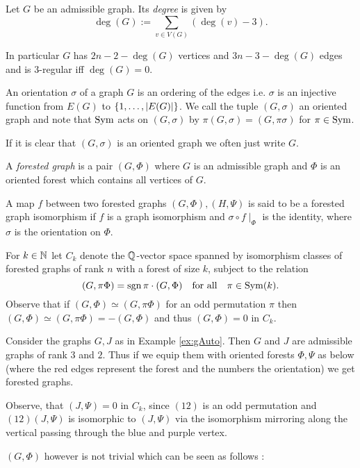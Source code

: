 \begin{definition}
	Let $G$ be an admissible graph. Its \emph{degree} is given by
	\[
		\deg(G) := \sum_{v \in V(G)} (\deg(v) - 3)
	.\] 
\end{definition}

In particular $G$ has $2n -2 - \deg(G)$ vertices and $3n -3 - \deg(G)$ edges and is $3$-regular iff $\deg(G) = 0$.

\begin{definition}
	An orientation $\sigma$ of a graph $G$ is an ordering of the edges i.e. $\sigma$ is an injective function from $E(G)$ to $\{1,\ldots,\abs{E(G)}\}$.
	We call the tuple $(G,\sigma)$ an oriented graph and note that $\operatorname{Sym}$ acts on $(G,\sigma)$ by $\pi (G,\sigma) = (G,\pi \sigma)$ for $\pi \in \operatorname{Sym}$.
\end{definition}

If it is clear that $(G,\sigma)$ is an oriented graph we often just write $G$.

\begin{definition}
	A \emph{forested graph} is a pair $(G,\Phi)$ where $G$ is an admissible graph and $\Phi$ is an oriented forest which contains all vertices of $G$.

	A map $f$ between two forested graphs $(G,\Phi), (H,\Psi)$ is said to be a forested graph isomorphism if $f$ is a graph isomorphism and $\sigma \circ f \mid_{\Phi} $  is
	the identity, where $\sigma$ is the orientation on $\Phi$.
\end{definition}

For $k \in \mathbb{N}$ let $C_{k}$ denote the $\mathbb{Q}$-vector space spanned by isomorphism classes of forested graphs of rank $n$ with a forest of size $k$, subject to the relation
\[
	(G,\pi \Phi) = \sgn{\pi} \cdot (G,\Phi) \qq{for all} \pi \in \on{Sym}(k)
.\]
Observe that if $(G,\Phi) \simeq (G,\pi \Phi)$ for an odd permutation $\pi$ then $(G,\Phi) \simeq (G,\pi \Phi) = - (G,\Phi)$ and thus $(G,\Phi) = 0$ in  $C_{k}$.

\begin{eg}
	Consider the graphs $G, J$ as in Example \ref{ex:gAuto}. Then $G$ and $J$ are admissible graphs of rank $3$ and $2$. Thus if we equip them with oriented forests $\Phi, \Psi$ as below 
	(where the red edges represent the forest and the numbers the orientation) we get forested graphs.


	Observe, that $(J,\Psi) = 0$ in $C_{k}$, since $ (1 2)$ is an odd permutation and  $(1 2) (J,\Psi)$ is isomorphic to $(J,\Psi)$ 
	via the isomorphism mirroring along the vertical passing through the blue and purple vertex.

	$(G,\Phi)$ however is not trivial which can be seen as follows : 
\end{eg}

